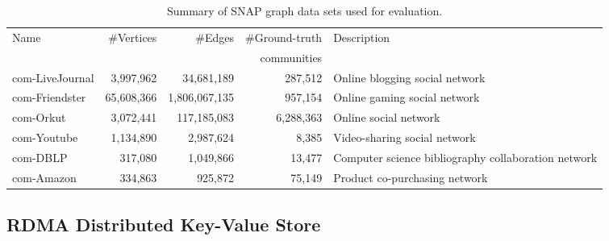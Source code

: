 \begin{table*}
  \centering
  \begin{tabular}{l r r r l}
    Name            & \#Vertices &       \#Edges & \#Ground-truth & Description \\
                    &            &               & communities    &             \\
    \hline
    com-LiveJournal &  3,997,962 &    34,681,189 & 287,512        & Online blogging social network \\
    com-Friendster  & 65,608,366 & 1,806,067,135 & 957,154        & Online gaming social network \\
    com-Orkut       &  3,072,441 &   117,185,083 & 6,288,363      & Online social network \\
    com-Youtube     &  1,134,890 &     2,987,624 & 8,385          & Video-sharing social network \\
    com-DBLP        &    317,080 &     1,049,866 & 13,477         & Computer science bibliography collaboration network \\
    com-Amazon      &    334,863 &       925,872 & 75,149         & Product co-purchasing network \\
    \hline
  \end{tabular}
  \caption{Summary of SNAP graph data sets used for evaluation.}
  \label{tab-datasets}
\end{table*}

\subsection{RDMA Distributed Key-Value Store}

